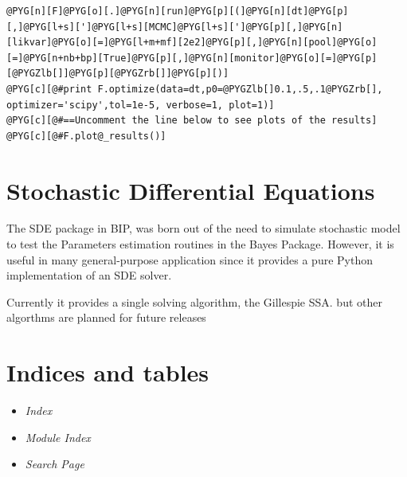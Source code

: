 \documentclass[a4paper,10pt,english]{manual}
\begin{document}
\begin{Verbatim}[commandchars=@\[\]]
@PYG[n][F]@PYG[o][.]@PYG[n][run]@PYG[p][(]@PYG[n][dt]@PYG[p][,]@PYG[l+s][']@PYG[l+s][MCMC]@PYG[l+s][']@PYG[p][,]@PYG[n][likvar]@PYG[o][=]@PYG[l+m+mf][2e2]@PYG[p][,]@PYG[n][pool]@PYG[o][=]@PYG[n+nb+bp][True]@PYG[p][,]@PYG[n][monitor]@PYG[o][=]@PYG[p][@PYGZlb[]]@PYG[p][@PYGZrb[]]@PYG[p][)]
@PYG[c][@#print F.optimize(data=dt,p0=@PYGZlb[]0.1,.5,.1@PYGZrb[], optimizer='scipy',tol=1e-5, verbose=1, plot=1)]
@PYG[c][@#==Uncomment the line below to see plots of the results]
@PYG[c][@#F.plot@_results()]
\end{Verbatim}

\resetcurrentobjects
\hypertarget{--doc-sde}{}

\hypertarget{sde}{}\chapter{Stochastic Differential Equations}

The SDE package in BIP, was born out of the need to simulate stochastic model to test the Parameters estimation routines in the Bayes Package. However, it is useful in many general-purpose application since it provides a pure Python implementation of an SDE solver.

Currently it provides a single solving algorithm, the Gillespie SSA. but other algorthms are planned for future releases


\chapter{Indices and tables}
\begin{itemize}
\item {} 
\emph{Index}

\item {} 
\emph{Module Index}

\item {} 
\emph{Search Page}

\end{itemize}


\renewcommand{\indexname}{Module Index}
\printmodindex
\renewcommand{\indexname}{Index}
\printindex
\end{document}
